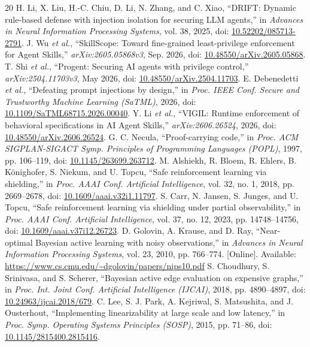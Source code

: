 \begin{thebibliography}{20}
 H. Li, X. Liu, H.-C. Chiu, D. Li, N. Zhang, and C. Xiao, ``DRIFT: Dynamic rule-based defense with injection isolation for securing LLM agents,'' in \emph{Advances in Neural Information Processing Systems}, vol. 38, 2025, doi: \href{https://doi.org/10.52202/085713-2791}{10.52202/085713-2791}.
 J. Wu \emph{et al.}, ``SkillScope: Toward fine-grained least-privilege enforcement for Agent Skills,'' \emph{arXiv:2605.05868v3}, Sep. 2026, doi: \href{https://doi.org/10.48550/arXiv.2605.05868}{10.48550/arXiv.2605.05868}.
 T. Shi \emph{et al.}, ``Progent: Securing AI agents with privilege control,'' \emph{arXiv:2504.11703v3}, May 2026, doi: \href{https://doi.org/10.48550/arXiv.2504.11703}{10.48550/arXiv.2504.11703}.
 E. Debenedetti \emph{et al.}, ``Defeating prompt injections by design,'' in \emph{Proc. IEEE Conf. Secure and Trustworthy Machine Learning (SaTML)}, 2026, doi: \href{https://doi.org/10.1109/SaTML68715.2026.00040}{10.1109/SaTML68715.2026.00040}.
 Y. Li \emph{et al.}, ``VIGIL: Runtime enforcement of behavioral specifications in AI Agent Skills,'' \emph{arXiv:2606.26524}, 2026, doi: \href{https://doi.org/10.48550/arXiv.2606.26524}{10.48550/arXiv.2606.26524}.
 G. C. Necula, ``Proof-carrying code,'' in \emph{Proc. ACM SIGPLAN-SIGACT Symp. Principles of Programming Languages (POPL)}, 1997, pp. 106--119, doi: \href{https://doi.org/10.1145/263699.263712}{10.1145/263699.263712}.
 M. Alshiekh, R. Bloem, R. Ehlers, B. K\"onighofer, S. Niekum, and U. Topcu, ``Safe reinforcement learning via shielding,'' in \emph{Proc. AAAI Conf. Artificial Intelligence}, vol. 32, no. 1, 2018, pp. 2669--2678, doi: \href{https://doi.org/10.1609/aaai.v32i1.11797}{10.1609/aaai.v32i1.11797}.
 S. Carr, N. Jansen, S. Junges, and U. Topcu, ``Safe reinforcement learning via shielding under partial observability,'' in \emph{Proc. AAAI Conf. Artificial Intelligence}, vol. 37, no. 12, 2023, pp. 14748--14756, doi: \href{https://doi.org/10.1609/aaai.v37i12.26723}{10.1609/aaai.v37i12.26723}.
 D. Golovin, A. Krause, and D. Ray, ``Near-optimal Bayesian active learning with noisy observations,'' in \emph{Advances in Neural Information Processing Systems}, vol. 23, 2010, pp. 766--774. [Online]. Available: \url{https://www.cs.cmu.edu/~dgolovin/papers/nips10.pdf}
 S. Choudhury, S. Srinivasa, and S. Scherer, ``Bayesian active edge evaluation on expensive graphs,'' in \emph{Proc. Int. Joint Conf. Artificial Intelligence (IJCAI)}, 2018, pp. 4890--4897, doi: \href{https://doi.org/10.24963/ijcai.2018/679}{10.24963/ijcai.2018/679}.
 C. Lee, S. J. Park, A. Kejriwal, S. Matsushita, and J. Ousterhout, ``Implementing linearizability at large scale and low latency,'' in \emph{Proc. Symp. Operating Systems Principles (SOSP)}, 2015, pp. 71--86, doi: \href{https://doi.org/10.1145/2815400.2815416}{10.1145/2815400.2815416}.
\end{thebibliography}
